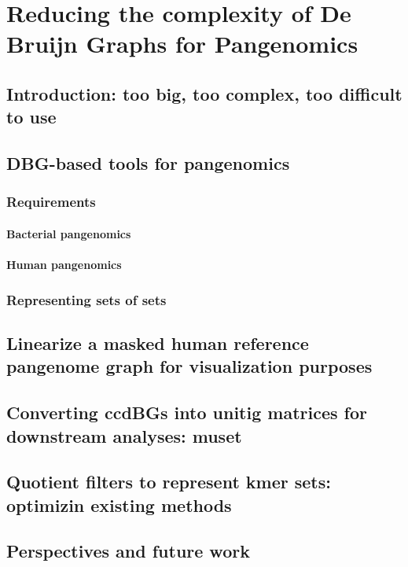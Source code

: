 \chapter{Reducing the complexity of De Bruijn Graphs for Pangenomics}
\label{sec:complexity}

\section{Introduction: too big, too complex, too difficult to use}

\section{DBG-based tools for pangenomics}

\subsection{Requirements}
\subsubsection{Bacterial pangenomics}
\subsubsection{Human pangenomics}

\subsection{Representing sets of \kmer sets}

\section{Linearize a masked human reference pangenome graph for visualization purposes}

\section{Converting ccdBGs into unitig matrices for downstream analyses: muset}

\section{Quotient filters to represent kmer sets: optimizin existing methods}

\section{Perspectives and future work}

